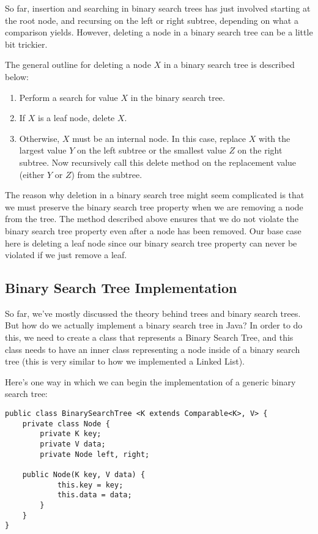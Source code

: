 So far, insertion and searching in binary search trees has just involved starting at the root node, and recursing on the left or right subtree, depending on what a comparison yields. However, deleting a node in a binary search tree can be a little bit trickier. 


The general outline for deleting a node $X$ in a binary search tree is described below:
\begin{enumerate}
    \item Perform a search for value $X$ in the binary search tree.
    \item If $X$ is a leaf node, delete $X$.
    \item Otherwise, $X$ must be an internal node. In this case, replace $X$ with the largest value $Y$ on the left subtree or the smallest value $Z$ on the right subtree. Now recursively call this delete method on the replacement value (either $Y$ or $Z$) from the subtree.
\end{enumerate}

The reason why deletion in a binary search tree might seem complicated is that we must preserve the binary search tree property when we are removing a node from the tree. The method described above ensures that we do not violate the binary search tree property even after a node has been removed. Our base case here is deleting a leaf node since our binary search tree property can never be violated if we just remove a leaf. 

\subsection{Binary Search Tree Implementation}

So far, we've mostly discussed the theory behind trees and binary search trees. But how do we actually implement a binary search tree in Java? In order to do this, we need to create a class that represents a Binary Search Tree, and this class needs to have an inner class representing a node inside of a binary search tree (this is very similar to how we implemented a Linked List).

Here's one way in which we can begin the implementation of a generic binary search tree:

\begin{lstlisting}
public class BinarySearchTree <K extends Comparable<K>, V> {
    private class Node {
        private K key;
        private V data;
        private Node left, right;

 	public Node(K key, V data) {
            this.key = key;
            this.data = data;
    	}
    }
}
\end{lstlisting}

